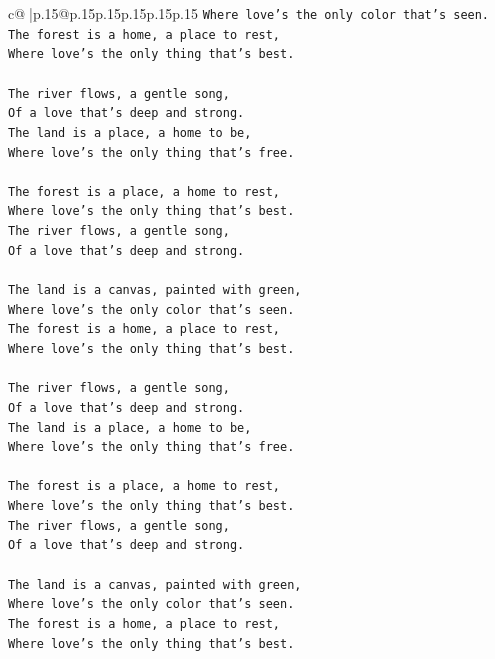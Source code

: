 \documentclass{article}
\begin{document}
{\begin{supertabular}{c@{$\;$}|p{.15\linewidth}@{}p{.15\linewidth}p{.15\linewidth}p{.15\linewidth}p{.15\linewidth}p{.15\linewidth}}
{{{\texttt{Where love's the only color that's seen.} \\
\texttt{The forest is a home, a place to rest,} \\
\texttt{Where love's the only thing that's best.} \\
\\ 
\texttt{The river flows, a gentle song,} \\
\texttt{Of a love that's deep and strong.} \\
\texttt{The land is a place, a home to be,} \\
\texttt{Where love's the only thing that's free.} \\
\\ 
\texttt{The forest is a place, a home to rest,} \\
\texttt{Where love's the only thing that's best.} \\
\texttt{The river flows, a gentle song,} \\
\texttt{Of a love that's deep and strong.} \\
\\ 
\texttt{The land is a canvas, painted with green,} \\
\texttt{Where love's the only color that's seen.} \\
\texttt{The forest is a home, a place to rest,} \\
\texttt{Where love's the only thing that's best.} \\
\\ 
\texttt{The river flows, a gentle song,} \\
\texttt{Of a love that's deep and strong.} \\
\texttt{The land is a place, a home to be,} \\
\texttt{Where love's the only thing that's free.} \\
\\ 
\texttt{The forest is a place, a home to rest,} \\
\texttt{Where love's the only thing that's best.} \\
\texttt{The river flows, a gentle song,} \\
\texttt{Of a love that's deep and strong.} \\
\\ 
\texttt{The land is a canvas, painted with green,} \\
\texttt{Where love's the only color that's seen.} \\
\texttt{The forest is a home, a place to rest,} \\
\texttt{Where love's the only thing that's best.} \\
}}}
\end{supertabular}}
\end{document}
